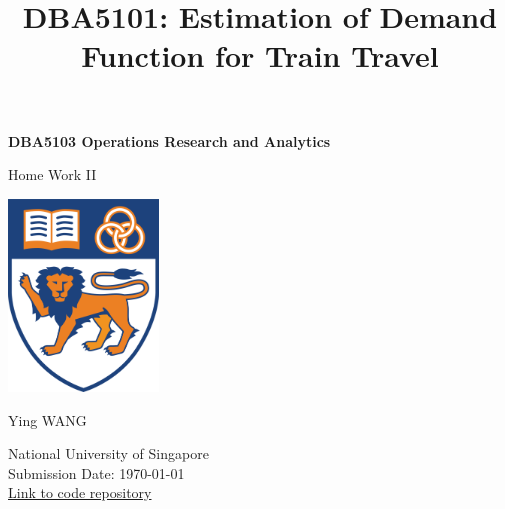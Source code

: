 \documentclass[12pt]{article}
\title{DBA5101: Estimation of Demand Function for Train Travel}
\author{}
\date{}
\begin{document}
\begin{titlepage}
    \centering
    \vspace*{1cm}
    {\Huge\bfseries DBA5103 Operations Research and Analytics\\[0.5em]}
    {\Huge Home Work II \par}
    \vspace{1cm}
    \includegraphics[width=0.30\textwidth]{nus_logo.png} \\[2em]
    {\large Ying WANG\par}
    \vspace{0.5cm}
    \vspace{1cm}
    {\large
    National University of Singapore \\
    \vspace{0.5cm}
    Submission Date: \today \\
    \vspace{0.3cm}
    \href{https://github.com/ying-jeanne/operation_research/tree/main/II}{Link to code repository}
    }
    \vfill
\end{titlepage}
\thispagestyle{fancy}
\end{document}
